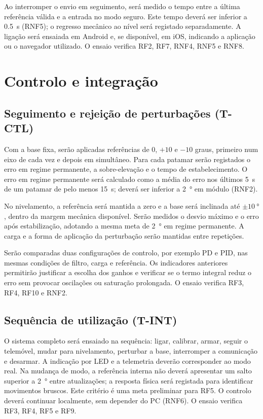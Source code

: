 Ao interromper o envio em seguimento, será medido o tempo entre a última referência válida e a entrada no modo seguro. Este tempo deverá ser inferior a \SI{0.5}{\second} (RNF5); o regresso mecânico ao nível será registado separadamente. A ligação será ensaiada em Android e, se disponível, em iOS, indicando a aplicação ou o navegador utilizado. O ensaio verifica RF2, RF7, RNF4, RNF5 e RNF8.

\section{Controlo e integração}
\subsection{Seguimento e rejeição de perturbações (T-CTL)}
Com a base fixa, serão aplicadas referências de $0$, $+10$ e $-10$ graus, primeiro num eixo de cada vez e depois em simultâneo. Para cada patamar serão registados o erro em regime permanente, a sobre-elevação e o tempo de estabelecimento. O erro em regime permanente será calculado como a média do erro nos últimos \SI{5}{\second} de um patamar de pelo menos \SI{15}{\second}; deverá ser inferior a \SI{2}{\degree} em módulo (RNF2).

No nivelamento, a referência será mantida a zero e a base será inclinada até $\pm\SI{10}{\degree}$, dentro da margem mecânica disponível. Serão medidos o desvio máximo e o erro após estabilização, adotando a mesma meta de \SI{2}{\degree} em regime permanente. A carga e a forma de aplicação da perturbação serão mantidas entre repetições.

Serão comparadas duas configurações de controlo, por exemplo PD e PID, nas mesmas condições de filtro, carga e referência. Os indicadores anteriores permitirão justificar a escolha dos ganhos e verificar se o termo integral reduz o erro sem provocar oscilações ou saturação prolongada. O ensaio verifica RF3, RF4, RF10 e RNF2.

\subsection{Sequência de utilização (T-INT)}
O sistema completo será ensaiado na sequência: ligar, calibrar, armar, seguir o telemóvel, mudar para nivelamento, perturbar a base, interromper a comunicação e desarmar. A indicação por LED e a telemetria deverão corresponder ao modo real. Na mudança de modo, a referência interna não deverá apresentar um salto superior a \SI{2}{\degree} entre atualizações; a resposta física será registada para identificar movimentos bruscos. Este critério é uma meta preliminar para RF5. O controlo deverá continuar localmente, sem depender do PC (RNF6). O ensaio verifica RF3, RF4, RF5 e RF9.

